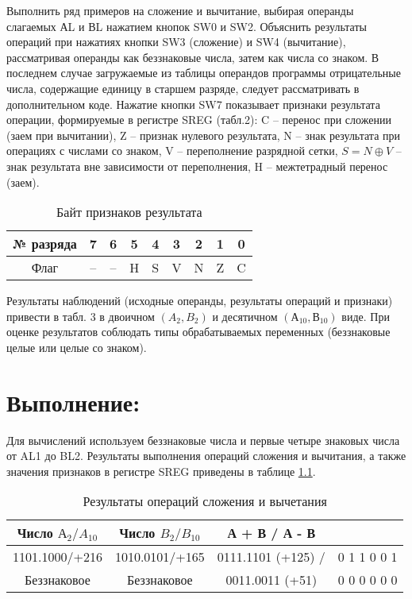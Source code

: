 \documentclass{bmstu}
\begin{document}
Выполнить ряд примеров на сложение и вычитание, выбирая операнды слагаемых АL и ВL нажатием кнопок SW0 и SW2.
Объяснить результаты операций при нажатиях кнопки SW3 (сложение) и SW4 (вычитание), рассматривая операнды как 
беззнаковые числа, затем как числа со знаком. В последнем случае загружаемые из таблицы операндов программы 
отрицательные числа, содержащие единицу в старшем разряде, следует рассматривать в дополнительном коде. Нажатие 
кнопки SW7 показывает признаки результата операции, формируемые в регистре SREG (табл.2): C – перенос при сложении 
(заем при вычитании), Z – признак нулевого результата, N – знак результата при операциях с числами со знаком, V – 
переполнение разрядной сетки, $S=N \oplus V$ – знак результата вне зависимости от переполнения, H  – межтетрадный 
перенос (заем). 

\begin{center}
\begin{table}[H]
\caption{Байт признаков результата}
\label{table:flags_table}
\begin{tabular}{| c | c | c | c | c | c | c | c | c |}
	\hline
		№ разряда &7 & 6 & 5 & 4 & 3 & 2 & 1 & 0 \\
	\hline
		Флаг & -- & -- & H & S & V & N & Z & C \\
	\hline
\end{tabular}
\end{table}
\end{center}


Результаты наблюдений (исходные операнды, результаты операций и признаки) привести в табл. 3 в двоичном $(A_2, B_2)$ и десятичном $(А_10,В_10)$ виде. При оценке результатов соблюдать типы обрабатываемых переменных (беззнаковые целые или целые со знаком). \newline


\chapter{Выполнение:}
Для вычислений используем беззнаковые числа и первые четыре знаковых числа от AL1 до BL2. Результаты выполнения операций сложения и вычитания, а также значения признаков в регистре SREG приведены в таблице \ref{table:sub_table}.

\begin{table}[H]
\caption{Результаты операций сложения и вычетания}
\label{table:sub_table}
\begin{tabular}{| c | c | c | c |}
	\hline
		Число $ А_2 / A_{10}$ & Число $ B_2/B_{10}$ & А + В / А - В & \text{Признаки: H S V N Z C} \\	
	\hline
		1101.1000/+216 & 1010.0101/+165 & 0111.1101 (+125) / & 0 1  1 0  0 1 \\
		Беззнаковое & Беззнаковое & 0011.0011 (+51) & 0 0  0 0  0 0 \\
	\hline
\end{tabular}
\end{table}
\end{document}
